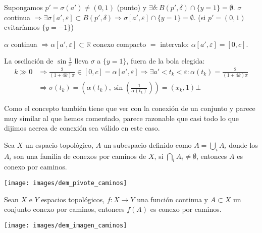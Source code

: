 \begin{ej}
\begin{enumerate}
\begin{demo}
            Supongamos $p' = \sigma\left( a' \right) \neq \left( 0, 1 \right)$ (punto) y $\exists \delta: B\left( p', \delta \right) \cap \{y = 1\} = \emptyset$. $\sigma$ continua $\Rightarrow \exists \sigma\left[ a', \varepsilon \right] \subset B\left( p', \delta \right) \Rightarrow \sigma\left[ a', \varepsilon \right] \cap \{y = 1\} = \emptyset$. (si $p' = \left( 0, 1 \right)$ evitaríamos $\{y = -1\}$)

            $\alpha$ continua $\Rightarrow \alpha\left[ a', \varepsilon \right] \subset \mathbb{R}$ conexo compacto $=$ intervalo: $\alpha\left[ a', \varepsilon \right] = \left[ 0, c \right]$.

            La oscilación de $\sin \frac{1}{x}$ lleva $\sigma$ a $\{y = 1\}$, fuera de la bola elegida:
            \begin{align*}
            k \gg 0 &\Rightarrow \frac{2}{\left( 1 + 4k \right) \pi} \in \left[ 0, c \right] = \alpha\left[ a', \varepsilon \right] \Rightarrow \exists a' < t_k < \varepsilon: \alpha\left( t_k \right) = \frac{2}{\left( 1 + 4k \right) \pi}\\ 
                &\Rightarrow \sigma\left( t_k \right) = \left( \alpha\left( t_k \right), \sin\left( \frac{1}{\alpha\left( t_k \right)} \right) \right) = \left( x_k, 1 \right) 
            \bot \end{align*}
    \end{demo}
\end{enumerate}
\end{ej}

Como el concepto también tiene que ver con la conexión de un conjunto y parece muy similar al que hemos comentado, parece razonable que casi todo lo que dijimos acerca de conexión sea válido en este caso.

\begin{theo}
Sea $X$ un espacio topológico, $A$ un subespacio definido como $A = \bigcup_{i} A_i$ donde los $A_i$ son una familia de conexos por caminos de $X$, si $\bigcap_{i} A_i \neq \emptyset$, entonces $A$ es conexo por caminos. 
\end{theo}
\begin{demo}
\begin{center}
    \texttt{[image: images/dem\_pivote\_caminos]} 
\end{center}
\end{demo}

\begin{theo}
Sean $X$ e $Y$ espacios topológicos, $f: X \rightarrow Y$ una función continua y $A \subset X$ un conjunto conexo por caminos, entonces $f\left( A \right)$ es conexo por caminos.
\end{theo}
\begin{demo}
\begin{center}
    \texttt{[image: images/dem\_imagen\_caminos]} 
\end{center}
\end{demo}

